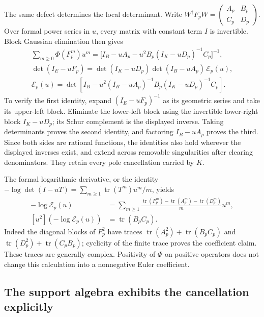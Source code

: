 The same defect determines the local determinant. Write
$W^\dagger F_pW=\left(\begin{smallmatrix}A_p&B_p\\C_p&D_p\end{smallmatrix}\right)$.
Over formal power series in $u$, every matrix with constant term $I$ is
invertible. Block Gaussian elimination then gives
\begin{equation}\tag{TDP9}
\begin{gathered}
\sum_{m\ge0}\Phi(F_p^m)u^m
 =\bigl[I_B-uA_p-u^2B_p(I_K-uD_p)^{-1}C_p\bigr]^{-1},\\
\det(I_E-uF_p)
 =\det(I_K-uD_p)\det(I_B-uA_p)\,\mathcal E_p(u),\\
\mathcal E_p(u)=
\det\!\left[I_B-u^2(I_B-uA_p)^{-1}
 B_p(I_K-uD_p)^{-1}C_p\right].
\end{gathered}
\end{equation}
To verify the first identity, expand $(I_E-uF_p)^{-1}$ as its geometric
series and take its upper-left block. Eliminate the lower-left block
using the invertible lower-right block $I_K-uD_p$; its Schur complement
is the displayed inverse. Taking determinants proves the second
identity, and factoring $I_B-uA_p$ proves the third. Since both sides are
rational functions, the identities also hold wherever the displayed
inverses exist, and extend across removable singularities after clearing
denominators. They retain every pole cancellation carried by $K$.

The formal logarithmic derivative, or the identity
$-\log\det(I-uT)=\sum_{m\ge1}\operatorname{tr}(T^m)u^m/m$, yields
\begin{equation}\tag{TDP10}
\begin{aligned}
-\log\mathcal E_p(u)
 &=\sum_{m\ge1}
 \frac{\operatorname{tr}(F_p^m)-\operatorname{tr}(A_p^m)
 -\operatorname{tr}(D_p^m)}{m}u^m,\\
[u^2](-\log\mathcal E_p(u))&=\operatorname{tr}(B_pC_p).
\end{aligned}
\end{equation}
Indeed the diagonal blocks of $F_p^2$ have traces
$\operatorname{tr}(A_p^2)+\operatorname{tr}(B_pC_p)$ and
$\operatorname{tr}(D_p^2)+\operatorname{tr}(C_pB_p)$; cyclicity of the
finite trace proves the coefficient claim. These traces are generally
complex. Positivity of $\Phi$ on positive operators does not change this
calculation into a nonnegative Euler coefficient.

\subsection{The support algebra exhibits the cancellation explicitly}


